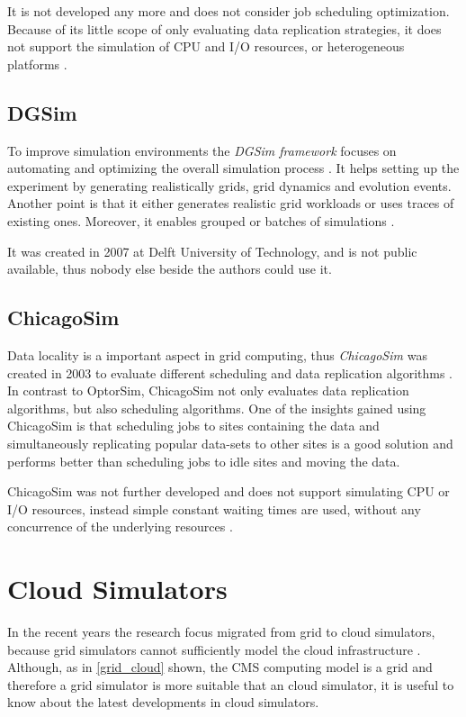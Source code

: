 It is not developed any more and does not consider job scheduling optimization. Because of its little scope of only evaluating data replication strategies, it does not support the simulation of CPU and I/O resources, or heterogeneous platforms \cite{optorsim}.


\subsection{DGSim}
To improve simulation environments the \textit{DGSim framework} focuses on automating and optimizing the overall simulation process \cite{dgsim}. It helps setting up the experiment by generating realistically grids, grid dynamics and evolution events. Another point is that it either generates realistic grid workloads or uses traces of existing ones. Moreover, it enables grouped or batches of simulations \cite{dgsim}.

It was created in 2007 at Delft University of Technology, and is not public available, thus nobody else beside the authors could use it.


\subsection{ChicagoSim}
Data locality is a important aspect in grid computing, thus \textit{ChicagoSim} was created in 2003 to evaluate different scheduling and data replication algorithms \cite{chicagosim}. In contrast to OptorSim, ChicagoSim not only evaluates data replication algorithms, but also scheduling algorithms. 
One of the insights gained using ChicagoSim is that scheduling jobs to sites containing the data and simultaneously replicating popular data-sets to other sites is a good solution and performs better than scheduling jobs to idle sites and moving the data.

ChicagoSim was not further developed and does not support simulating CPU or I/O resources, instead simple constant waiting times are used, without any concurrence of the underlying resources \cite{chicagosim}. 


\newpage
\section{Cloud Simulators}
In the recent years the research focus migrated from grid to cloud simulators, because grid simulators cannot sufficiently model the cloud infrastructure \cite{compare_grid_cloud}. Although, as in \cref{grid_cloud} shown, the CMS computing model is a grid and therefore a grid simulator is more suitable that an cloud simulator, it is useful to know about the latest developments in cloud simulators. 

